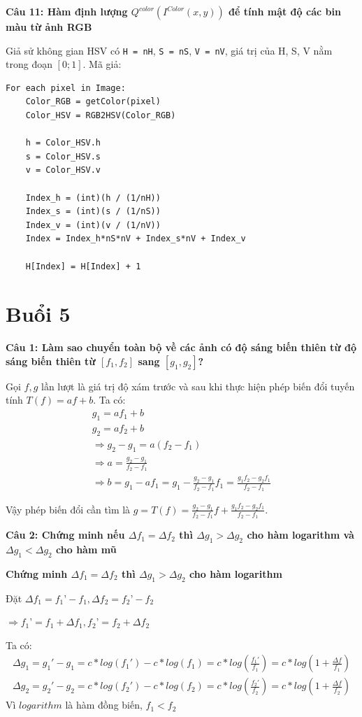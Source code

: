 \textbf{Câu 11: Hàm định lượng $Q^{color}(I^{Color}(x, y))$ để tính mật độ các bin màu từ ảnh RGB}

Giả sử không gian HSV có \texttt{H = nH}, \texttt{S = nS}, \texttt{V = nV}, giá trị của H, S, V nằm trong đoạn $[0; 1]$. Mã giả:
\begin{lstlisting}
For each pixel in Image:
	Color_RGB = getColor(pixel)
	Color_HSV = RGB2HSV(Color_RGB)

	h = Color_HSV.h
	s = Color_HSV.s
	v = Color_HSV.v

	Index_h = (int)(h / (1/nH))
	Index_s = (int)(s / (1/nS))
	Index_v = (int)(v / (1/nV))
	Index = Index_h*nS*nV + Index_s*nV + Index_v

	H[Index] = H[Index] + 1
\end{lstlisting}

\section{Buổi 5}

\textbf{Câu 1: Làm sao chuyển toàn bộ về các ảnh có độ sáng biến thiên từ độ sáng biến thiên từ $[f_1, f_2]$ sang $[g_1,g_2]$?}

Gọi $f, g$ lần lượt là giá trị độ xám trước và sau khi thực hiện phép biến đổi tuyến tính $T(f) = af+b$. Ta có:
\begin{gather*}
	g_1 = a f_1 + b \\
	g_2 = a f_2 + b \\
	\Rightarrow g_2 - g_1 = a(f_2 - f_1) \\
	\Rightarrow a = \frac{g_2 - g_1}{f_2 - f_1} \\
	\Rightarrow b = g_1 - a f_1 = g_1 - \frac{g_2 - g_1}{f_2 - f_1}f_1 = \frac{g_1 f_2 - g_2 f_1}{f_2 - f_1}
\end{gather*}

Vậy phép biến đổi cần tìm là $g = T(f) = \frac{g_2 - g_1}{f_2 - f_1} f + \frac{g_1 f_2 - g_2 f_1}{f_2 - f_1}$.

\textbf{Câu 2: Chứng minh nếu $\Delta f_1 = \Delta f_2$ thì $\Delta g_1 > \Delta g_2$ cho hàm logarithm và $\Delta g_1 < \Delta g_2$ cho hàm mũ}

\textbf{Chứng minh $\Delta f_1 = \Delta f_2$ thì $\Delta g_1 > \Delta g_2$ cho hàm logarithm}

Đặt $\Delta f_1 = f_1’ - f_1, \Delta f_2 = f_2’ - f_2$

$\Rightarrow f_1’ = f_1 + \Delta f_1, f_2’ = f_2 + \Delta f_2$

Ta có:
\begin{gather*}
	\Delta g_1 = g_1' - g_1 = c*log(f_1') - c*log(f_1) = c*log(\frac{f_1'}{f_1}) = c * log(1 + \frac{\Delta f}{f_1})  \\
	\Delta g_2 = g_2' - g_2 = c*log(f_2') - c*log(f_2) = c*log(\frac{f_2'}{f_2}) = c * log(1 + \frac{\Delta f}{f_2})
\end{gather*}
Vì $logarithm$ là hàm đồng biến, $f_1 < f_2$

